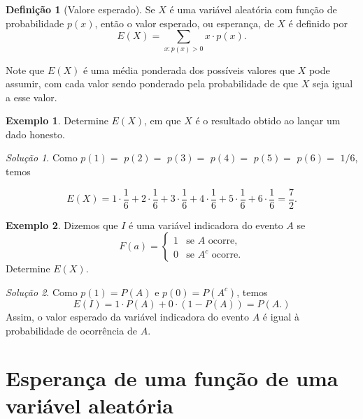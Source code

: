 \documentclass[]{book}
\theoremstyle{definition}
\newtheorem{definition}{Definição}[chapter]
\theoremstyle{definition}
\newtheorem{example}{Exemplo}[chapter]
\theoremstyle{definition}
\theoremstyle{remark}
\newtheorem*{solution}{Solução}
\begin{document}
\begin{definition}[Valore esperado]
\protect\hypertarget{def:defEsperanca}{}{\label{def:defEsperanca} \iffalse (Valore esperado) \fi{} }Se \(X\) é uma variável aleatória com função de probabilidade \(p(x)\), então o valor esperado, ou esperança, de \(X\) é definido por
\[E(X) = \sum_{x:p(x)>0} x\cdot p(x).\]
\end{definition}

Note que \(E(X)\) é uma média ponderada dos possíveis valores que \(X\) pode assumir, com cada valor sendo ponderado pela probabilidade de que \(X\) seja igual a esse valor.

\begin{example}
\protect\hypertarget{exm:esperancaDado}{}{\label{exm:esperancaDado} }Determine \(E(X)\), em que \(X\) é o resultado obtido ao lançar um dado honesto.
\end{example}

\begin{solution}
\iffalse{} {Solução. } \fi{}Como \(p(1)=\) \(p(2)=\) \(p(3)=\) \(p(4)=\) \(p(5)=\) \(p(6)=\) \(1/6\), temos

\[E(X) = 1\cdot \frac{1}{6} +2\cdot \frac{1}{6}+3\cdot \frac{1}{6}+4\cdot \frac{1}{6}+5\cdot \frac{1}{6}+6\cdot \frac{1}{6}=\frac{7}{2}.\]
\end{solution}

\begin{example}
\protect\hypertarget{exm:unnamed-chunk-139}{}{\label{exm:unnamed-chunk-139} }Dizemos que \(I\) é uma variável indicadora do evento \(A\) se
\begin{equation}
  F(a) =
    \begin{cases}
      1 & \text{se $A$ ocorre,}\\
      0 & \text{se $A^c$ ocorre.}
    \end{cases}       
\end{equation}
Determine \(E(X).\)
\end{example}

\begin{solution}
\iffalse{} {Solução. } \fi{}Como \(p(1)=P(A)\) e \(p(0)=P(A^c)\), temos
\[E(I)=1\cdot P(A) + 0\cdot (1-P(A)) = P(A.)\]
Assim, o valor esperado da variável indicadora do evento \(A\) é igual à probabilidade de ocorrência de \(A\).
\end{solution}

\hypertarget{esperanuxe7a-de-uma-funuxe7uxe3o-de-uma-variuxe1vel-aleatuxf3ria}{%
\section{Esperança de uma função de uma variável aleatória}\label{esperanuxe7a-de-uma-funuxe7uxe3o-de-uma-variuxe1vel-aleatuxf3ria}}
\end{document}
